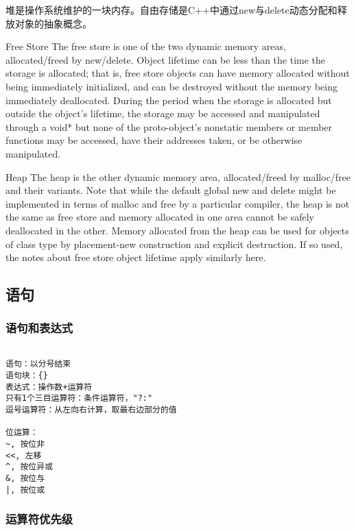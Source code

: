 \documentclass[UTF8]{../computerUniverse}
\begin{document}
堆是操作系统维护的一块内存。自由存储是C++中通过new与delete动态分配和释放对象的抽象概念。

Free Store
The free store is one of the two dynamic memory areas, allocated/freed by new/delete. Object lifetime can be less than the time the storage is allocated; that is, free store objects can have memory allocated without being immediately initialized, and can be destroyed without the memory being immediately deallocated. During the period when the storage is allocated but outside the object's lifetime, the storage may be accessed and manipulated through a void* but none of the proto-object's nonstatic members or member functions may be accessed, have their addresses taken, or be otherwise manipulated.

Heap
The heap is the other dynamic memory area, allocated/freed by malloc/free and their variants. Note that while the default global new and delete might be implemented in terms of malloc and free by a particular compiler, the heap is not the same as free store and memory allocated in one area cannot be safely deallocated in the other. Memory allocated from the heap can be used for objects of class type by placement-new construction and explicit destruction. If so used, the notes about free store object lifetime apply similarly here.

\subsection{语句}

\subsubsection{语句和表达式}

\begin{lstlisting}

语句：以分号结束
语句块：{}
表达式：操作数+运算符
只有1个三目运算符：条件运算符，"?:"
逗号运算符：从左向右计算，取最右边部分的值

位运算：
~, 按位非
<<, 左移
^, 按位异或
&, 按位与
|, 按位或

\end{lstlisting}



\subsubsection{运算符优先级}
\end{document}
